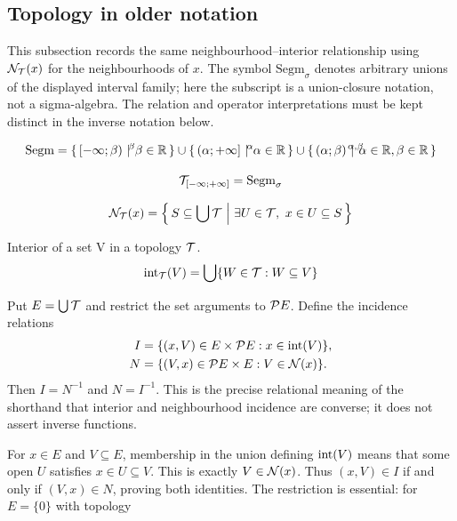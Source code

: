 \subsection{Topology in older notation}
This subsection records the same neighbourhood--interior relationship
using $\mathcal{N}_{\mathcal{T}}(x)$ for the neighbourhoods of $x$. The symbol
$\mbox{Segm}_\sigma$ denotes arbitrary unions of the displayed interval
family; here the subscript is a union-closure notation, not a
sigma-algebra. The relation and operator interpretations must be kept
distinct in the inverse notation below.
\begin{definition}
\[
\mbox{Segm} = \ccc{\beta}{[-\infty;\beta)}{\beta\in\real}\cup \ccc{\alpha}{(\alpha;+\infty]}{\alpha\in\real}\cup \ccc{\alpha,\beta}{(\alpha;\beta)}{\alpha\in\real,\beta\in\real}
\]
\end{definition}
\begin{definition}
\[
\mathcal{T}_{[-\infty;+\infty]} = \mbox{Segm}_\sigma
\]
\end{definition}
\begin{definition}[neighbourhoods]
\[
\mathcal{N}_{\mathcal{T}}(x) = \left\{\,S \subseteq \bigcup \mathcal{T}\ \middle|\  \exists  U\in \mathcal{T},\  x\in U \subseteq S \,\right\}
\]
\end{definition}
\begin{definition}[interior]
Interior of a set V in a topology $\mathcal{T}$.
\[
\mathrm{int}_{\mathcal{T}}(V) = \bigcup
\{W\in \mathcal{T}: W\subseteq V\}
\]
\end{definition}
\begin{theorem}
Put $E=\bigcup\mathcal{T}$ and restrict the set arguments to $\mathcal{P} E$.
Define the incidence relations
\[
\begin{aligned}
I&=\{(x,V)\in E\times\mathcal{P} E:x\in\mathrm{int}(V)\},\\
N&=\{(V,x)\in\mathcal{P} E\times E:V\in\mathcal{N}(x)\}.
\end{aligned}
\]
Then $I=N^{-1}$ and $N=I^{-1}$. This is the precise relational
meaning of the shorthand that interior and neighbourhood incidence
are converse; it does not assert inverse functions.
\end{theorem}
\Proof
For $x\in E$ and $V\subseteq E$, membership in the union defining
$\mathrm{int}(V)$ means that some open $U$ satisfies $x\in U\subseteq V$.
This is exactly $V\in\mathcal{N}(x)$. Thus $(x,V)\in I$ if and only if
$(V,x)\in N$, proving both identities.
The restriction is essential: for $E=\{0\}$ with topology

